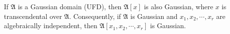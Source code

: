 If $\mathfrak{A}$ is a Gaussian domain (UFD), then $\mathfrak{A}[x]$ is also Gaussian, where $x$ is transcendental over $\mathfrak{A}$. Consequently, if $\mathfrak{A}$ is Gaussian and $x_1, x_2, \cdots, x_r$ are algebraically independent, then $\mathfrak{A}[x_1, x_2, \cdots, x_r]$ is Gaussian.
